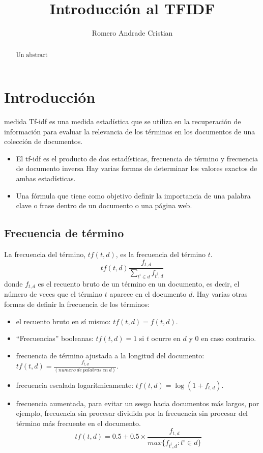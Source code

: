 \documentclass{IEEEtran}
\begin{document}
\title{Introducción al TFIDF}
\author{Romero Andrade Cristian}
\maketitle{}
\tableofcontents{}
\begin{abstract}
  Un abstract
\end{abstract}

\section{Introducción}\label{sec:introduccion}
 medida Tf-idf  es una medida estadística que se utiliza
en la recuperación de información para evaluar la relevancia de los términos en
los documentos de una colección de documentos.

\begin{itemize}
  \item El tf-idf es el producto de dos estadísticas, frecuencia de término y frecuencia de documento inversa
        Hay varias formas de determinar los valores exactos de ambas estadísticas.
  \item Una fórmula que tiene como objetivo definir la importancia de una palabra clave o frase dentro de un documento o una página web.
\end{itemize}

\subsection{Frecuencia de término}\label{sec:frec-de-term}
La frecuencia del término, $tf(t, d)$, es la frecuencia del término $t$.
\[ tf(t,d)\frac{f_{t,d}}{\sum_{t^{i}\in d}f_{t^{i}, d}}\]
donde $f_{t, d}$ es el recuento bruto de un término en un documento, es decir,
el número de veces que el término $t$ aparece en el documento $d$.
Hay varias otras formas de definir la frecuencia de los términos:
\begin{itemize}
  \item el recuento bruto en sí mismo: $tf(t, d) = f(t, d)$.
  \item ``Frecuencias'' booleanas: $tf(t, d ) = 1$ si $t$ ocurre en $d$ y $0$ en caso
        contrario.
  \item frecuencia de término ajustada a la longitud del documento:
        $tf(t, d) = \frac{f_{t, d}}{(numero\ de\ palabras\ en\ d)}$.
  \item frecuencia escalada logarítmicamente: $tf(t, d) = \log{(1 + f_{ t , d})}$.
  \item frecuencia aumentada, para evitar un sesgo hacia documentos más largos,
        por ejemplo, frecuencia sin procesar dividida por la frecuencia sin
        procesar del término más frecuente en el documento.
        \[ tf(t,d)=0.5+0.5 \times \frac{f_{t, d}}{max\{f_{t^{i}, d}: t^{i} \in d\}} \]
\end{itemize}
\end{document}
